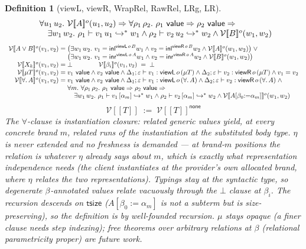 \documentclass[10pt]{article}
\newtheorem{definition}[theorem]{Definition}
\newcommand{\tp}{\varepsilon}
\newcommand{\bra}[1]{\alpha_{#1}}
\newcommand{\subs}[3]{#1[#2{:=}#3]}
\newcommand{\Val}{\mathsf{value}}
\newcommand{\msteps}[3]{#1 \vdash #2 \hookrightarrow^{*} #3}
\newcommand{\hast}[4]{#1; #2 \vdash #3 : #4}
\newcommand{\sT}[1]{[\![#1]\!]}
\newcommand{\LRg}[2]{\mathcal{V}\sT{#2}^{#1}}
\newcommand{\LRc}[1]{\mathcal{V}\sT{#1}}
\newcommand{\bv}[1]{\beta_{#1}}
\newcommand{\allb}[1]{\forall.\,#1}
\newcommand{\bapp}[2]{#1\,[\bra{#2}]}
\begin{document}
\begin{definition}[\textsf{viewL}, \textsf{viewR}, \textsf{WrapRel}, \textsf{RawRel}, \textsf{LRg}, \textsf{LR}]
\[\begin{array}{r@{\;}c@{\;}l}
  && \forall u_1\,u_2.\ \LRg{o}{A}(u_1,u_2) \Rightarrow \forall \rho_1\,\rho_2.\ \rho_1\ \Val \Rightarrow \rho_2\ \Val \Rightarrow \\
  && \quad \exists w_1\,w_2.\ \msteps{\rho_1}{v_1\,u_1}{w_1} \wedge \msteps{\rho_2}{v_2\,u_2}{w_2} \wedge \LRg{o}{B}(w_1,w_2)
\end{array}
\]
\[
\begin{array}{r@{\;}c@{\;}l}
\LRg{o}{A \vee B}(v_1,v_2) &=& \bigl(\exists w_1\,w_2.\ v_1 = \mathsf{inl}^{\mathsf{viewL}\,o\,B} w_1 \wedge v_2 = \mathsf{inl}^{\mathsf{viewR}\,o\,B} w_2 \wedge \LRg{o}{A}(w_1,w_2)\bigr) \;\vee \\
  && \bigl(\exists w_1\,w_2.\ v_1 = \mathsf{inr}^{\mathsf{viewL}\,o\,A} w_1 \wedge v_2 = \mathsf{inr}^{\mathsf{viewR}\,o\,A} w_2 \wedge \LRg{o}{B}(w_1,w_2)\bigr) \\
\LRg{o}{X_k}(v_1,v_2) &=& \bot \qquad\qquad \LRg{o}{\bv{i}}(v_1,v_2) \;=\; \bot \\
\LRg{o}{\mu T}(v_1,v_2) &=& v_1\ \Val \wedge v_2\ \Val \wedge
  \hast{\Delta_1}{\tp}{v_1}{\mathsf{viewL}\,o\,(\mu T)} \wedge \hast{\Delta_2}{\tp}{v_2}{\mathsf{viewR}\,o\,(\mu T)} \wedge v_1 = v_2 \\
\LRg{o}{\allb{A}}(v_1,v_2) &=& v_1\ \Val \wedge v_2\ \Val \wedge
  \hast{\Delta_1}{\tp}{v_1}{\mathsf{viewL}\,o\,(\allb{A})} \wedge \hast{\Delta_2}{\tp}{v_2}{\mathsf{viewR}\,o\,(\allb{A})} \;\wedge \\
  && \forall m.\ \forall \rho_1\,\rho_2.\ \rho_1\ \Val \Rightarrow \rho_2\ \Val \Rightarrow \\
  && \quad \exists w_1\,w_2.\ \msteps{\rho_1}{\bapp{v_1}{m}}{w_1} \wedge \msteps{\rho_2}{\bapp{v_2}{m}}{w_2} \wedge \LRg{o}{\subs{A}{\bv{0}}{\bra{m}}}(w_1,w_2)
\end{array}
\]
\[
\LRc{T} \;:=\; \LRg{\mathsf{none}}{T}
\]
The $\forall$-clause is \emph{instantiation closure}: related generic values yield, at
every concrete brand $m$, related runs of the instantiation at the substituted body
type.  $\eta$ is never extended and no freshness is demanded — at brand-$m$ positions
the relation is whatever $\eta$ already says about $m$, which is exactly what
representation independence needs (the client instantiates at the provider's own
allocated brand, where $\eta$ relates the two representations).  Typings stay at the
\emph{syntactic} type, so degenerate $\bv{}$-annotated values relate vacuously through
the $\bot$ clause at $\bv{i}$.  The recursion descends on $\mathsf{tsize}$
($\subs{A}{\bv{0}}{\bra{m}}$ is not a subterm but is size-preserving), so the
definition is by well-founded recursion.  $\mu$ stays opaque (a finer clause needs step
indexing); free theorems over \emph{arbitrary} relations at $\beta$ (relational
parametricity proper) are future work.
\end{definition}
\end{document}
